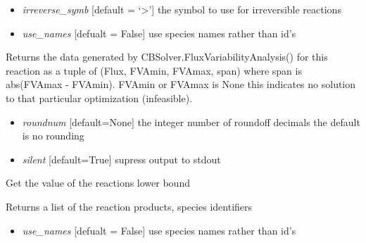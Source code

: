 \documentclass[a4paper,11pt,english]{sphinxmanual}
\begin{document}
\begin{fulllineitems}
\begin{fulllineitems}
\begin{itemize}
\item {} 
\emph{irreverse\_symb} {[}default = `\textgreater{}'{]} the symbol to use for irreversible reactions

\item {} 
\emph{use\_names} {[}defualt = False{]} use species names rather than id's

\end{itemize}

\end{fulllineitems}


\begin{fulllineitems}
\label{modules_doc:cbmpy.CBModel.Reaction.getFVAdata}
Returns the data generated by CBSolver.FluxVariabilityAnalysis() for this reaction as a tuple of
(Flux, FVAmin, FVAmax, span) where span is abs(FVAmax - FVAmin). FVAmin or FVAmax is None this indicates no solution
to that particular optimization (infeasible).
\begin{itemize}
\item {} 
\emph{roundnum} {[}default=None{]} the integer number of roundoff decimals the default is no rounding

\item {} 
\emph{silent} {[}default=True{]} supress output to stdout

\end{itemize}

\end{fulllineitems}


\begin{fulllineitems}
\label{modules_doc:cbmpy.CBModel.Reaction.getLowerBound}
Get the value of the reactions lower bound

\end{fulllineitems}


\begin{fulllineitems}
\label{modules_doc:cbmpy.CBModel.Reaction.getProductIds}
Returns a list of the reaction products, species identifiers
\begin{itemize}
\item {} 
\emph{use\_names} {[}defualt = False{]} use species names rather than id's


\end{itemize}
\end{fulllineitems}
\end{fulllineitems}
\end{document}
